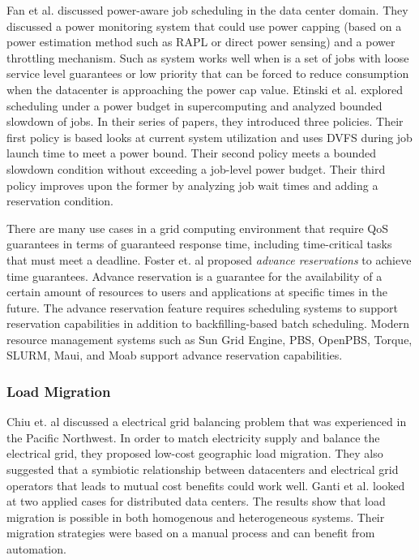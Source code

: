 Fan et al. \cite{PowerAwareServer1} discussed power-aware job scheduling in the data center domain. 
They discussed a power monitoring system that could use power capping (based on a power estimation method such as RAPL or direct power sensing) and a power throttling mechanism. Such as system works well when is a set of jobs with loose service level guarantees or low priority that can be
forced to reduce consumption when the datacenter is approaching the power cap value. Etinski et al. \cite{Etinski1,Etinski2,Etinski3,Etinski4} explored scheduling under a power budget in supercomputing and analyzed bounded slowdown of jobs. In their series of papers, they introduced three policies. Their first policy is based looks at current system utilization and uses DVFS during job launch time to meet a power bound. Their second policy meets a bounded slowdown condition without exceeding a job-level power budget. Their third policy improves upon the former by analyzing job wait times and adding a reservation condition. 

There are many use cases in a grid computing environment that require QoS
guarantees in terms of guaranteed response time, including time-critical
tasks that must meet a deadline. Foster et. al \cite{foster_distributed_1999,foster_anatomy_2001} proposed \emph{advance reservations} to achieve time guarantees. Advance reservation is a guarantee for the availability of a certain amount of resources to users and applications at specific times in the future. The advance reservation feature requires scheduling systems to support reservation capabilities in addition to backfilling-based batch scheduling. Modern resource management systems such as Sun Grid Engine, PBS, OpenPBS, Torque, SLURM, Maui, and Moab support advance reservation capabilities.

\subsubsection{Load Migration}
Chiu et. al \cite{chiu_electric_2012} discussed a electrical grid balancing problem that was experienced in the Pacific Northwest. In order to match electricity supply and balance the electrical grid, they proposed low-cost geographic load migration. They also suggested that a symbiotic relationship between datacenters and electrical grid operators that leads to mutual cost benefits could work well.  Ganti et al. \cite{Ghatikar2012b} looked at two applied cases for distributed data centers. The results show that load migration is possible in both homogenous and heterogeneous systems. Their migration strategies were based on a manual process and can benefit from automation.

